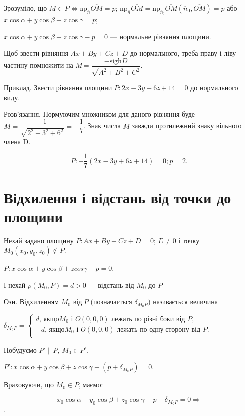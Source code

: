 Зрозуміло, що $M \in P \Leftrightarrow \text{np}_{\overline{n}}\overline{OM} = p$; $\text{np}_{\overline{n}}\overline{OM} = \text{np}_{\overline{n}_0} \overline{OM}(\overline{n}_0, \overline{OM}) = p$ або
$x \cos \alpha + y \cos \beta + z \cos \gamma = p$;

$x \cos \alpha + y \cos \beta + z \cos \gamma - p = 0$ --- нормальне рівняння площини.

Щоб звести рівняння $Ax + By + Cz + D$ до нормального, треба праву і
ліву частину помножити на $M = \dfrac{- \text{sigh} D }{\sqrt{A^2 + B^2 + C^2}}$.

Приклад. Звести рівняння площини $P: 2x - 3y + 6z + 14 = 0$ до нормального
виду.

Розв’язання. Нормуючим множником для даного рівняння буде
$M = \dfrac{- 1 }{\sqrt{2^2 + 3^2 + 6^2}} = -\dfrac{1}{7}$. Знак числа $M$ завжди протилежний знаку вільного
члена D.

$$P: -\dfrac{1}{7}(2x - 3y + 6z + 14) = 0; p = 2.$$


\section{Відхилення і відстань від точки до площини}

Нехай задано площину $P: Ax + By + Cz + D = 0$; $D \neq 0$ і точку
$M_0(x_0,y_0,z_0) \notin P$.

$P: x \cos \alpha + y \cos \beta + z cos \gamma - p = 0$.

І нехай $\rho(M_0,P) = d > 0$ --- відстань від $M_0$ до $P$.

Озн. Відхиленням $M_0$ від $P$ (позначається $\delta_{M_0P}$) називається величина

$\delta_{M_0P} = \left\{\begin{matrix}
	d \text{, якщо} M_0 \text{ і } O(0,0,0)\text{ лежать по різні боки від } P, \\
	-d \text{, якщо} M_0 \text{ і } O(0,0,0)\text{ лежать по одну сторону від } P. \\
\end{matrix} \right.$



Побудуємо $P' \parallel P$, $M_0 \in  P'$.

$P': x \cos \alpha + y \cos \beta + z \cos \gamma - (p + \delta_{M_0P}) = 0$.

Враховуючи, що $M_0 \in P$, маємо:

$$x_0 \cos \alpha + y_0 \cos \beta + z_0 \cos \gamma - p - \delta_{M_0P} = 0 \Rightarrow$$.

